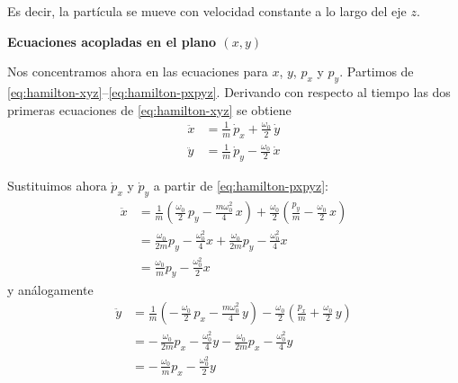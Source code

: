 \documentclass{article}
\begin{document}
Es decir, la partícula se mueve con velocidad constante a lo largo del eje $z$.

\textcolor{trueblue}{\textbf{Ecuaciones acopladas en el plano $(x,y)$}}

Nos concentramos ahora en las ecuaciones para $x$, $y$, $p_{x}$ y $p_{y}$.
Partimos de \eqref{eq:hamilton-xyz}–\eqref{eq:hamilton-pxpyz}. Derivando con
respecto al tiempo las dos primeras ecuaciones de \eqref{eq:hamilton-xyz} se obtiene
\begin{equation}
\begin{split}
\ddot{x}
&= \frac{1}{m}\,\dot{p}_{x}
 + \frac{\omega_{0}}{2}\,\dot{y} \\[4pt]
\ddot{y}
&= \frac{1}{m}\,\dot{p}_{y}
 - \frac{\omega_{0}}{2}\,\dot{x}
\end{split}
\label{eq:ddotx-ddoty-pre}
\end{equation}

Sustituimos ahora $\dot{p}_{x}$ y $\dot{p}_{y}$ a partir de
\eqref{eq:hamilton-pxpyz}:
\begin{equation}
\begin{split}
\ddot{x}
&= \frac{1}{m}
   \left(
     \frac{\omega_{0}}{2}\,p_{y}
     - \frac{m\omega_{0}^{2}}{4}\,x
   \right)
 + \frac{\omega_{0}}{2}
   \left(
     \frac{p_{y}}{m}
     - \frac{\omega_{0}}{2}\,x
   \right) \\[4pt]
&= \frac{\omega_{0}}{2m}p_{y}
   - \frac{\omega_{0}^{2}}{4}x
   + \frac{\omega_{0}}{2m}p_{y}
   - \frac{\omega_{0}^{2}}{4}x \\[4pt]
&= \frac{\omega_{0}}{m}p_{y}
   - \frac{\omega_{0}^{2}}{2}x
\end{split}
\label{eq:ddotx-con-py}
\end{equation}
y análogamente
\begin{equation}
\begin{split}
\ddot{y}
&= \frac{1}{m}
   \left(
     -\,\frac{\omega_{0}}{2}\,p_{x}
     - \frac{m\omega_{0}^{2}}{4}\,y
   \right)
 - \frac{\omega_{0}}{2}
   \left(
     \frac{p_{x}}{m}
     + \frac{\omega_{0}}{2}\,y
   \right) \\[4pt]
&= -\,\frac{\omega_{0}}{2m}p_{x}
   - \frac{\omega_{0}^{2}}{4}y
   - \frac{\omega_{0}}{2m}p_{x}
   - \frac{\omega_{0}^{2}}{4}y \\[4pt]
&= -\,\frac{\omega_{0}}{m}p_{x}
   - \frac{\omega_{0}^{2}}{2}y
\end{split}
\label{eq:ddoty-con-px}
\end{equation}
\end{document}

